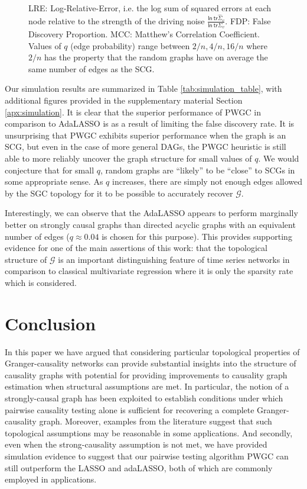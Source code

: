 \documentclass{statsoc}
\def\gcg{\mathcal{G}}  %
\def\ln{\mathsf{ln\ }}  %
\def\tr{\mathsf{tr }}  %
\begin{document}
\begin{figure}[!h]
{    LRE: Log-Relative-Error, i.e. the log sum of squared errors at
    each node relative to the strength of the driving noise
    $\frac{\ln \tr \widehat{\Sigma}_v}{\ln \tr \Sigma_v}$.  FDP: False
    Discovery Proportion.  MCC: Matthew's Correlation Coefficient.\\

    Values of $q$ (edge probability) range between
    $2 / n, 4 / n, 16 / n$ where $2 / n$ has the property that the
    random graphs have on average the same number of edges as the
    SCG.}
\end{figure}

Our simulation results are summarized in Table
\ref{tab:simulation_table}, with additional figures provided in the
supplementary material Section \ref{apx:simulation}.  It is clear that
the superior performance of PWGC in comparison to AdaLASSO is as a
result of limiting the false discovery rate.  It is unsurprising that
PWGC exhibits superior performance when the graph is an SCG, but even
in the case of more general DAGs, the PWGC heuristic is still able to
more reliably uncover the graph structure for small values of $q$.  We
would conjecture that for small $q$, random graphs are ``likely'' to
be ``close'' to SCGs in some appropriate sense.  As $q$ increases,
there are simply not enough edges allowed by the SGC topology for it
to be possible to accurately recover $\gcg$.

Interestingly, we can observe that the AdaLASSO appears to perform
marginally better on strongly causal graphs than directed acyclic
graphs with an equivalent number of edges ($q \approx 0.04$ is chosen for
this purpose).  This provides supporting evidence for one of the main
assertions of this work: that the topological structure of $\gcg$ is
an important distinguishing feature of time series networks in
comparison to classical multivariate regression where it is only the
sparsity rate which is considered.

\section{Conclusion}
\label{sec:conclusion}
In this paper we have argued that considering particular topological
properties of Granger-causality networks can provide substantial
insights into the structure of causality graphs with potential for
providing improvements to causality graph estimation when structural
assumptions are met.  In particular, the notion of a strongly-causal
graph has been exploited to establish conditions under which pairwise
causality testing alone is sufficient for recovering a complete
Granger-causality graph.  Moreover, examples from the literature
suggest that such topological assumptions may be reasonable in some
applications.  And secondly, even when the strong-causality assumption
is not met, we have provided simulation evidence to suggest that our
pairwise testing algorithm PWGC can still outperform the LASSO and
adaLASSO, both of which are commonly employed in applications.
\end{document}
